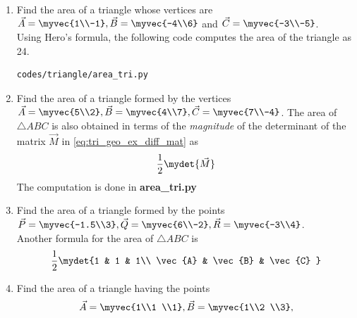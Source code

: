\begin{enumerate}[label=\arabic*.,ref=\thesubsection.\theenumi]
%
%
\item Find the area of a triangle whose vertices are 
$\vec{A}=\myvec{1\\-1}, 
\vec{B} = \myvec{-4\\6}$ and
$ 
\vec{C} = \myvec{-3\\-5}
$.
%
\\
\solution
  Using Hero's formula, the following code computes the area of the  triangle as 24.
%
\begin{lstlisting}
codes/triangle/area_tri.py
\end{lstlisting}
%
%
\item Find the area of a triangle formed by the vertices $\vec{A}=\myvec{5\\2}, \vec{B}=\myvec{4\\7}, \vec{C}=\myvec{7\\-4}$.
\solution  The area of $\triangle ABC$ is also obtained  in terms of the  {\em magnitude} of the determinant of the matrix $\vec{M}$ in  \eqref{eq:tri_geo_ex_diff_mat} as
%
\begin{align}
\frac{1}{2}\mydet{\vec{M}}
\end{align}
The computation is done in \textbf{area\_tri.py}
\item Find the area of a triangle formed by the points $\vec{P}=\myvec{-1.5\\3}, \vec{Q}=\myvec{6\\-2}, \vec{R}=\myvec{-3\\4}$.
\\
\solution Another formula for the area of $\triangle ABC$  is
%
\begin{align}
\frac{1}{2}\mydet{1 & 1 & 1\\ \vec{A} & \vec{B} & \vec{C} }
\end{align}
%
\item Find the area of a triangle having the points
%
\begin{align}
\vec{A} = \myvec{1\\1 \\1},
\vec{B} = \myvec{1\\2 \\3},

\end{align}
\end{enumerate}
